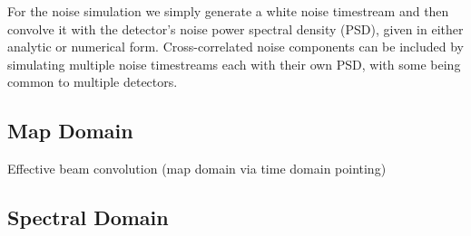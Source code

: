 For the noise simulation we simply generate a white noise timestream and then convolve it with the detector's noise power spectral density (PSD), given in either analytic or numerical form. Cross-correlated noise components can be included by simulating multiple noise timestreams each with their own PSD, with some being common to multiple detectors.


\subsection{Map Domain}

Effective beam convolution (map domain via time domain pointing)


\subsection{Spectral Domain}

%



